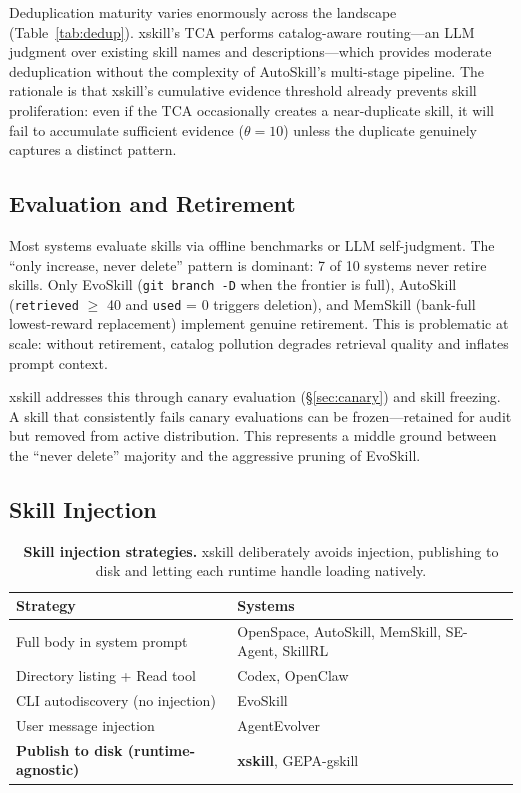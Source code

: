 \documentclass[11pt]{article}
\begin{document}
Deduplication maturity varies enormously across the landscape (Table~\ref{tab:dedup}). xskill's TCA performs catalog-aware routing---an LLM judgment over existing skill names and descriptions---which provides moderate deduplication without the complexity of AutoSkill's multi-stage pipeline. The rationale is that xskill's cumulative evidence threshold already prevents skill proliferation: even if the TCA occasionally creates a near-duplicate skill, it will fail to accumulate sufficient evidence ($\theta = 10$) unless the duplicate genuinely captures a distinct pattern.

\subsection{Evaluation and Retirement}

Most systems evaluate skills via offline benchmarks or LLM self-judgment. The ``only increase, never delete'' pattern is dominant: 7 of 10 systems never retire skills. Only EvoSkill (\texttt{git branch -D} when the frontier is full), AutoSkill (\texttt{retrieved} $\geq$ 40 and \texttt{used} = 0 triggers deletion), and MemSkill (bank-full lowest-reward replacement) implement genuine retirement. This is problematic at scale: without retirement, catalog pollution degrades retrieval quality and inflates prompt context.

xskill addresses this through canary evaluation (\S\ref{sec:canary}) and skill freezing. A skill that consistently fails canary evaluations can be frozen---retained for audit but removed from active distribution. This represents a middle ground between the ``never delete'' majority and the aggressive pruning of EvoSkill.

\subsection{Skill Injection}

\begin{table}[t]
\centering
\caption{\textbf{Skill injection strategies.} xskill deliberately avoids injection, publishing to disk and letting each runtime handle loading natively.}
\label{tab:injection}
\small
\begin{tabular}{@{}ll@{}}
\toprule
\textbf{Strategy} & \textbf{Systems} \\
\midrule
Full body in system prompt & OpenSpace, AutoSkill, MemSkill, SE-Agent, SkillRL \\
Directory listing + Read tool & Codex, OpenClaw \\
CLI autodiscovery (no injection) & EvoSkill \\
User message injection & AgentEvolver \\
\textbf{Publish to disk (runtime-agnostic)} & \textbf{xskill}, GEPA-gskill \\
\bottomrule
\end{tabular}
\end{table}
\end{document}
